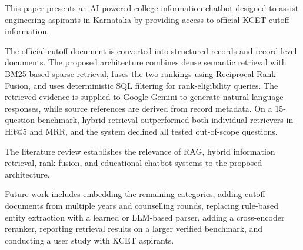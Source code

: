 \documentclass[conference]{IEEEtran}
\begin{document}
This paper presents an AI-powered college
information chatbot designed to assist engineering
aspirants in Karnataka by providing access to
official KCET cutoff information.

The official cutoff document is converted into structured
records and record-level documents. The proposed architecture
combines dense semantic retrieval with BM25-based sparse retrieval,
fuses the two rankings using Reciprocal Rank Fusion, and uses
deterministic SQL filtering for rank-eligibility queries. The
retrieved evidence is supplied to Google Gemini to generate
natural-language responses, while source references are derived
from record metadata. On a 15-question benchmark, hybrid retrieval
outperformed both individual retrievers in Hit@5 and MRR, and the
system declined all tested out-of-scope questions.

The literature review establishes the relevance
of RAG, hybrid information retrieval, rank fusion,
and educational chatbot systems to the proposed
architecture.

Future work includes embedding the remaining categories, adding
cutoff documents from multiple years and counselling rounds, replacing rule-based entity extraction with
a learned or LLM-based parser, adding a cross-encoder reranker,
reporting retrieval results on a larger verified benchmark, and
conducting a user study with KCET aspirants.
\end{document}
